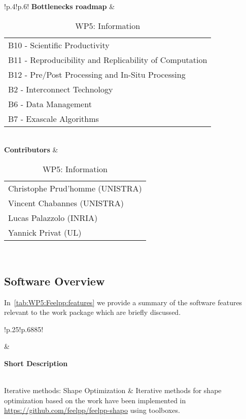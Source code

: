 \begin{table}[!ht]
{{\begin{tabular}{!{\color{numpexgray}\vrule}p{.4\textwidth}!{\color{numpexgray}\vrule}p{.6\textwidth}!{\color{numpexgray}\vrule}}
        \textbf{Bottlenecks roadmap} & \begin{tabular}{l}
B10 - Scientific Productivity\\
B11 - Reproducibility and Replicability of Computation\\
B12 - Pre/Post Processing and In-Situ Processing\\
B2 - Interconnect Technology\\
B6 - Data Management\\
B7 - Exascale Algorithms\\
\end{tabular} \\
\textbf{Contributors} & \begin{tabular}{l}
Christophe Prud'homme (UNISTRA)\\
Vincent Chabannes (UNISTRA)\\
Lucas Palazzolo (INRIA)\\
Yannick Privat (UL)
\end{tabular}\\
        \bottomrule
    \end{tabular}
    }}
    \caption{WP5: \Feelpp Information}
\end{table}

\subsection{Software Overview}
\label{sec:WP5:Feelpp:summary}

In~\cref{tab:WP5:Feelpp:features} we provide a summary of the software features relevant to the work package which are briefly discussed.

\begin{table}[!ht]
    \centering
    {
        \setlength{\parindent}{0pt}
        \def\arraystretch{1.25}
        {
            \fontsize{9}{11}\selectfont
            \begin{tabular}{!{\color{numpexgray}\vrule}p{.25\linewidth}!{\color{numpexgray}\vrule}p{.6885\linewidth}!{\color{numpexgray}\vrule}}

     &  {\rule{0pt}{2.5ex}\color{white}\bf Short Description }\\

    Iterative methods: Shape Optimization & Iterative methods for shape optimization based on the work \cite{feppon_f_null_2020} have been implemented in \url{https://github.com/feelpp/feelpp-shapo} using \Feelpp toolboxes.\\
\end{tabular}
        }
    }
    \caption{WP5: \Feelpp Features}
    \label{tab:WP5:Feelpp:features}
\end{table}


